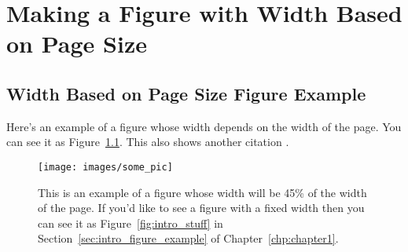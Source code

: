\chapter{Making a Figure with Width Based on Page Size}
\label{apdx:appendixa}

\section{Width Based on Page Size Figure Example} \label{sec:appendixa_figure_example}
Here's an example of a figure whose width depends on the width
of the page. You can see it as Figure~\ref{fig:appendix_some_pic}. This also shows another citation \cite{aeyels86local}.

\begin{figure}[htbp]
  \centering
  \texttt{[image: images/some\_pic]}
  \caption[Example figure whose width depends on page size]{
    This is an example of a figure whose width will be 45\% of the
    width of the page. If you'd like to see a figure with a fixed
    width then you can see it as Figure~\ref{fig:intro_stuff} in
    Section~\ref{sec:intro_figure_example} of Chapter~\ref{chp:chapter1}.}
  \label{fig:appendix_some_pic}
\end{figure}
